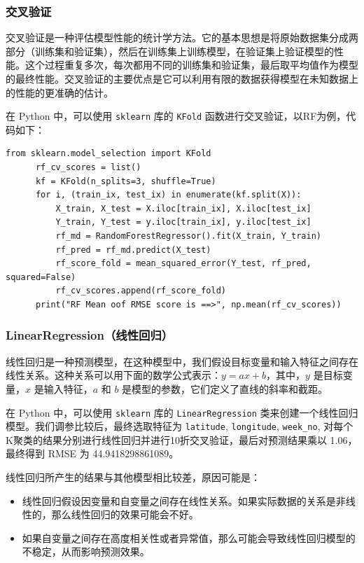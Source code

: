 \documentclass{ctexart}
\begin{document}
\subsubsection{交叉验证}

交叉验证是一种评估模型性能的统计学方法。它的基本思想是将原始数据集分成两部分（训练集和验证集），然后在训练集上训练模型，在验证集上验证模型的性能。这个过程重复多次，每次都用不同的训练集和验证集，最后取平均值作为模型的最终性能。交叉验证的主要优点是它可以利用有限的数据获得模型在未知数据上的性能的更准确的估计。

在 Python 中，可以使用 \texttt{sklearn} 库的 \texttt{KFold} 函数进行交叉验证，以RF为例，代码如下：

\begin{lstlisting}[style=Python]
      from sklearn.model_selection import KFold
      rf_cv_scores = list()
      kf = KFold(n_splits=3, shuffle=True)
      for i, (train_ix, test_ix) in enumerate(kf.split(X)):
          X_train, X_test = X.iloc[train_ix], X.iloc[test_ix]
          Y_train, Y_test = y.iloc[train_ix], y.iloc[test_ix]
          rf_md = RandomForestRegressor().fit(X_train, Y_train)
          rf_pred = rf_md.predict(X_test)
          rf_score_fold = mean_squared_error(Y_test, rf_pred, squared=False)
          rf_cv_scores.append(rf_score_fold)
      print("RF Mean oof RMSE score is ==>", np.mean(rf_cv_scores))
\end{lstlisting}

\subsubsection{LinearRegression（线性回归）}

线性回归是一种预测模型，在这种模型中，我们假设目标变量和输入特征之间存在线性关系。这种关系可以用下面的数学公式表示：$y = a x + b$，其中，$y$ 是目标变量，$x$ 是输入特征，$a$ 和 $b$ 是模型的参数，它们定义了直线的斜率和截距。

在 Python 中，可以使用 \texttt{sklearn} 库的 \texttt{LinearRegression} 类来创建一个线性回归模型。我们调参比较后，最终选取特征为 \texttt{latitude}, \texttt{longitude}, \texttt{week\_no}, 对每个K聚类的结果分别进行线性回归并进行10折交叉验证，最后对预测结果乘以 1.06，最终得到 RMSE 为 44.9418298861089。

线性回归所产生的结果与其他模型相比较差，原因可能是：

\begin{itemize}
      \item 线性回归假设因变量和自变量之间存在线性关系。如果实际数据的关系是非线性的，那么线性回归的效果可能会不好。
      \item 如果自变量之间存在高度相关性或者异常值，那么可能会导致线性回归模型的不稳定，从而影响预测效果。
\end{itemize}
\end{document}
